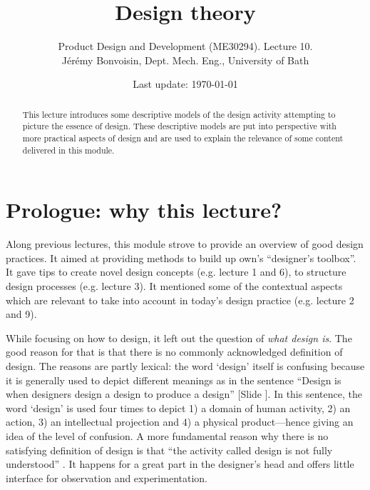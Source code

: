 \documentclass{article}
\newcounter{slide}
\begin{document}
\title{Design theory}

\author{Product Design and Development (ME30294). Lecture 10. \\ Jérémy Bonvoisin, Dept. Mech. Eng., University of Bath}
\date{Last update: \today}

\maketitle

\begin{abstract}
This lecture introduces some descriptive models of the design activity attempting to picture the essence of design. These descriptive models are put into perspective with more practical aspects of design and are used to explain the relevance of some content delivered in this module. 
\end{abstract}

\tableofcontents

\section{Prologue: why this lecture?}
\label{sec:prologue}
Along previous lectures, this module strove to provide an overview of good design practices. It aimed at providing methods to build up own's ``designer's toolbox''. It gave tips to create novel design concepts (e.g. lecture 1 and 6), to structure design processes (e.g. lecture 3). It mentioned some of the contextual aspects which are relevant to take into account in today's design practice (e.g. lecture 2 and 9). 

While focusing on how to design, it left out the question of \emph{what design is}. The good reason for that is that there is no commonly acknowledged definition of design. The reasons are partly lexical: the word `design' itself is confusing because it is generally used to depict different meanings as in the sentence ``Design is when designers design a design to produce a design'' \cite{heskett2001past} {\color{blue}[Slide ]}. In this sentence, the word `design' is used four times to depict 1) a domain of human activity, 2) an action, 3) an intellectual projection and 4) a physical product---hence giving an idea of the level of confusion. A more fundamental reason why there is no satisfying definition of design is that ``the activity called design is not fully understood'' \cite{hybsEvolutionaryProcessModel1992}. It happens for a great part in the designer's head and offers little interface for observation and experimentation.
\end{document}
